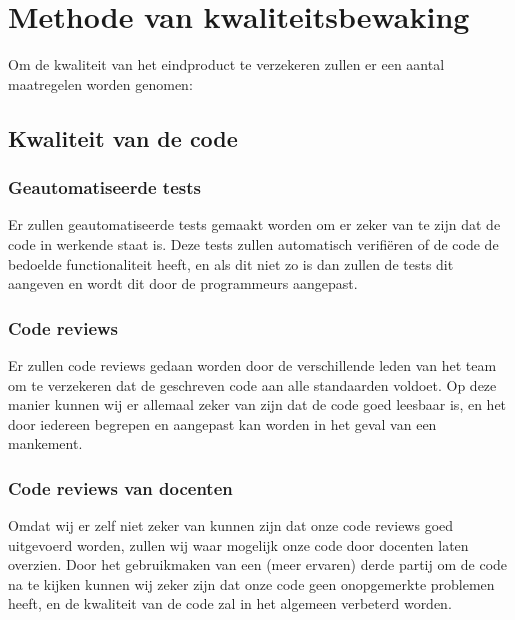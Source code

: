 \chapter{Methode van kwaliteitsbewaking}


Om de kwaliteit van het eindproduct te verzekeren zullen er een aantal maatregelen worden genomen:

\section{Kwaliteit van de code}
	\subsection{Geautomatiseerde tests}
		Er zullen geautomatiseerde tests gemaakt worden om er zeker van te zijn dat de code in werkende staat is.
		Deze tests zullen automatisch verifiëren of de code de bedoelde functionaliteit heeft, en als dit niet zo is dan zullen de tests dit aangeven en wordt dit door de programmeurs aangepast.

	\subsection{Code reviews}
		Er zullen code reviews gedaan worden door de verschillende leden van het team om te verzekeren dat de geschreven code aan alle standaarden voldoet.
		Op deze manier kunnen wij er allemaal zeker van zijn dat de code goed leesbaar is, en het door iedereen begrepen en aangepast kan worden in het geval van een mankement.
		
	\subsection{Code reviews van docenten}
		Omdat wij er zelf niet zeker van kunnen zijn dat onze code reviews goed uitgevoerd worden, zullen wij waar mogelijk onze code door docenten laten overzien.
		Door het gebruikmaken van een (meer ervaren) derde partij om de code na te kijken kunnen wij zeker zijn dat onze code geen onopgemerkte problemen heeft, en de kwaliteit van de code zal in het algemeen verbeterd worden.

